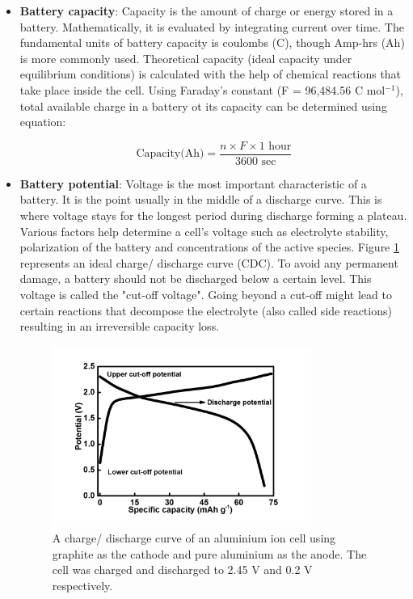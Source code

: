 \begin{itemize}
\item \textbf{Battery capacity}: Capacity is the amount of charge or energy stored in a battery. Mathematically, it is evaluated by integrating current over time. The fundamental units of battery capacity is coulombs (C), though Amp-hrs (Ah) is more commonly used.  Theoretical capacity (ideal capacity under equilibrium conditions) is calculated with the help of chemical reactions that take place inside the cell. Using Faraday’s constant (F = 96,484.56 C mol$^{-1}$), total available charge in a battery ot its capacity can be determined using equation:

\begin{equation} \label{eq1}
  \text{Capacity(Ah)}=\frac{n \times F \times 1 \text{ hour}}{3600 \text{ sec}}
\end{equation}

\item \textbf{Battery potential}: Voltage is the  most important characteristic of a battery. It is the point usually in the middle of a discharge curve. This is where voltage stays for the longest period during discharge forming a plateau. Various factors help determine a cell's voltage such as electrolyte stability, polarization of the battery and concentrations of the active species. Figure \ref{Figures/chap1fig:CDCforcellvoltage} represents an ideal charge/ discharge curve (CDC). To avoid any permanent damage, a battery should not be discharged below a certain level. This voltage is called the "cut-off voltage". Going beyond a cut-off might lead to certain reactions that decompose the electrolyte (also called side reactions) resulting in an irreversible capacity loss. 

\begin{figure}[tbh!]
\centering
\includegraphics[width=0.8\textwidth]{Figures/chap1fig/CDCforcellvoltage}
\caption{A charge/ discharge curve of an aluminium ion cell using graphite as the cathode and pure aluminium as the anode. The cell was charged and discharged to 2.45 V and 0.2 V respectively.}
\label{Figures/chap1fig:CDCforcellvoltage}
\end{figure}


\end{itemize}
